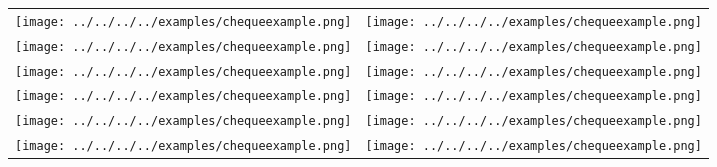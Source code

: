 \documentclass{article}%
\begin{document}
\begin{longtabu}{X[c] X[c]}
\texttt{[image: ../../../../examples/chequeexample.png]}&\texttt{[image: ../../../../examples/chequeexample.png]}\\%
\texttt{[image: ../../../../examples/chequeexample.png]}&\texttt{[image: ../../../../examples/chequeexample.png]}\\%
\texttt{[image: ../../../../examples/chequeexample.png]}&\texttt{[image: ../../../../examples/chequeexample.png]}\\%
\texttt{[image: ../../../../examples/chequeexample.png]}&\texttt{[image: ../../../../examples/chequeexample.png]}\\%
\texttt{[image: ../../../../examples/chequeexample.png]}&\texttt{[image: ../../../../examples/chequeexample.png]}\\%
\texttt{[image: ../../../../examples/chequeexample.png]}&\texttt{[image: ../../../../examples/chequeexample.png]}\\%
\end{longtabu}%
\end{document}

